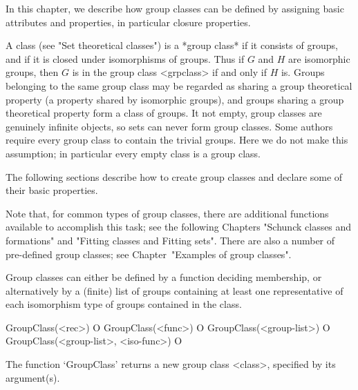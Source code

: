 
In this chapter, we describe how group classes can be defined by assigning
basic attributes and properties, in particular closure properties. 

A class (see "Set theoretical classes") is a *group class* if it consists of
groups, and if it is closed under isomorphisms of groups. Thus if $G$ and
$H$ are isomorphic groups,  then $G$ is in the group class <grpclass> if and
only if
$H$ is. Groups belonging to the same group class may be regarded as sharing
a group theoretical property (a property shared by isomorphic groups), and
groups sharing a group theoretical property form a class of groups. It
not empty, group classes are genuinely infinite objects, so {\GAP} sets can
never form group classes. Some authors require every group class to contain
the trivial groups. Here we do not make this assumption; in particular every
empty class is a group class.


The following sections describe how to create group classes and
declare some of their basic properties. 

Note that,
for common types of group classes, there are additional functions available
to accomplish this task; see the following Chapters "Schunck classes and
formations" and "Fitting classes and Fitting sets". There are also a number
of pre-defined group classes; see Chapter~"Examples of group classes".


\null


Group classes can either be defined by a function deciding membership, or
alternatively by a (finite) list of groups containing at least one
representative of each isomorphism type of groups contained in the class.

\>GroupClass(<rec>) O
\>GroupClass(<func>) O
\>GroupClass(<group-list>) O
\>GroupClass(<group-list>, <iso-func>) O

The function `GroupClass' returns a new group class <class>, specified by its
argument(s).


